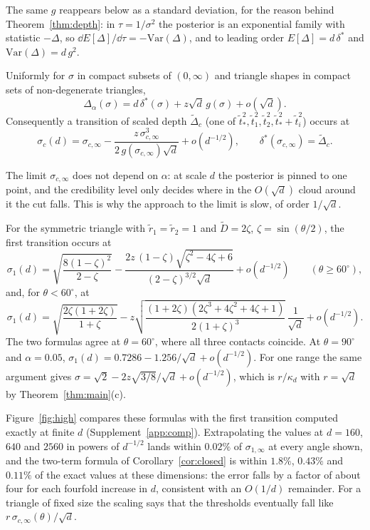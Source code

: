 The same $g$ reappears below as a standard deviation, for the reason behind Theorem~\ref{thm:depth}: in
$\tau = 1/\sigma^2$ the posterior is an exponential family with statistic $-\Delta$, so $\dd E[\Delta]/\dd\tau = -\mathrm{Var}(\Delta)$,
and to leading order $E[\Delta] = d\,\delta^*$ and $\mathrm{Var}(\Delta) = d\,g^2$.

\begin{theorem}\label{thm:high}
Uniformly for $\sigma$ in compact subsets of $(0, \infty)$ and triangle shapes in compact sets of non-degenerate
triangles,
\[ \Delta_\alpha(\sigma) = d\,\delta^*(\sigma) + z\sqrt d\,g(\sigma) + o(\sqrt d). \]
Consequently a transition of scaled depth $\tilde\Delta_c$ (one of $\tilde t_*^2, \tilde t_1^2, \tilde t_2^2, \tilde t_*^2 + \tilde t_i^2$)
occurs at
\[ \sigma_c(d) = \sigma_{c,\infty} - \frac{z\,\sigma_{c,\infty}^3}{2\,g(\sigma_{c,\infty})\sqrt d} + o(d^{-1/2}),
   \qquad \delta^*(\sigma_{c,\infty}) = \tilde\Delta_c . \]
\end{theorem}

The limit $\sigma_{c,\infty}$ does not depend on $\alpha$: at scale $d$ the posterior is pinned to one point, and the
credibility level only decides where in the $O(\sqrt d)$ cloud around it the cut falls. This is why the approach to the
limit is slow, of order $1/\sqrt d$.

\begin{corollary}\label{cor:closed}
For the symmetric triangle with $\tilde r_1 = \tilde r_2 = 1$ and $\tilde D = 2\zeta$, $\zeta = \sin(\theta/2)$, the first transition
occurs at
\[ \sigma_1(d) = \sqrt{\frac{8(1-\zeta)^2}{2-\zeta}} - \frac{2z\,(1-\zeta)\sqrt{\zeta^2 - 4\zeta + 6}}{(2-\zeta)^{3/2}\sqrt d} + o(d^{-1/2})
   \qquad (\theta \ge 60^\circ), \]
and, for $\theta < 60^\circ$, at
\[ \sigma_1(d) = \sqrt{\frac{2\zeta(1+2\zeta)}{1+\zeta}} - z\sqrt{\frac{(1+2\zeta)(2\zeta^3 + 4\zeta^2 + 4\zeta + 1)}{2(1+\zeta)^3}}\,\frac{1}{\sqrt d} + o(d^{-1/2}).
\]
The two formulas agree at $\theta = 60^\circ$, where all three contacts coincide. At $\theta = 90^\circ$ and $\alpha = 0.05$,
$\sigma_1(d) = 0.7286 - 1.256/\sqrt d + o(d^{-1/2})$. For one range the same argument gives
$\sigma = \sqrt2 - 2z\sqrt{3/8}/\sqrt d + o(d^{-1/2})$, which is $r/\kappa_d$ with $r = \sqrt d$ by Theorem~\ref{thm:main}(c).
\end{corollary}

Figure~\ref{fig:high} compares these formulas with the first transition computed exactly at finite $d$
(Supplement~\ref{app:comp}). Extrapolating the values at $d = 160$, $640$ and $2560$ in powers of $d^{-1/2}$ lands within
$0.02\%$ of $\sigma_{1,\infty}$ at every angle shown, and the two-term formula of Corollary~\ref{cor:closed} is within
$1.8\%$, $0.43\%$ and $0.11\%$ of the exact values at these dimensions: the error falls by a factor of about four for
each fourfold increase in $d$, consistent with an $O(1/d)$ remainder. For a triangle of fixed size the scaling says that the thresholds eventually fall
like $r\,\sigma_{c,\infty}(\theta)/\sqrt d$.

